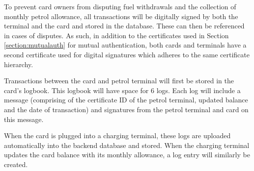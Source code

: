 To prevent card owners from disputing fuel withdrawals and the collection of monthly petrol allowance, all transactions will be digitally signed by both the terminal and the card and stored in the database. These can then be referenced in cases of disputes. As such, in addition to the certificates used in Section \ref{section:mutualauth} for mutual authentication, both cards and terminals have a second certificate used for digital signatures which adheres to the same certificate hierarchy.

Transactions between the card and petrol terminal will first be stored in the card's logbook. This logbook will have space for 6 logs. Each log will include a message (comprising of the certificate ID of the petrol terminal, updated balance and the date of transaction) and signatures from the petrol terminal and card on this message. 

When the card is plugged into a charging terminal, these logs are uploaded automatically into the backend database and stored. When the charging terminal updates the card balance with its monthly allowance, a log entry will similarly be created. 